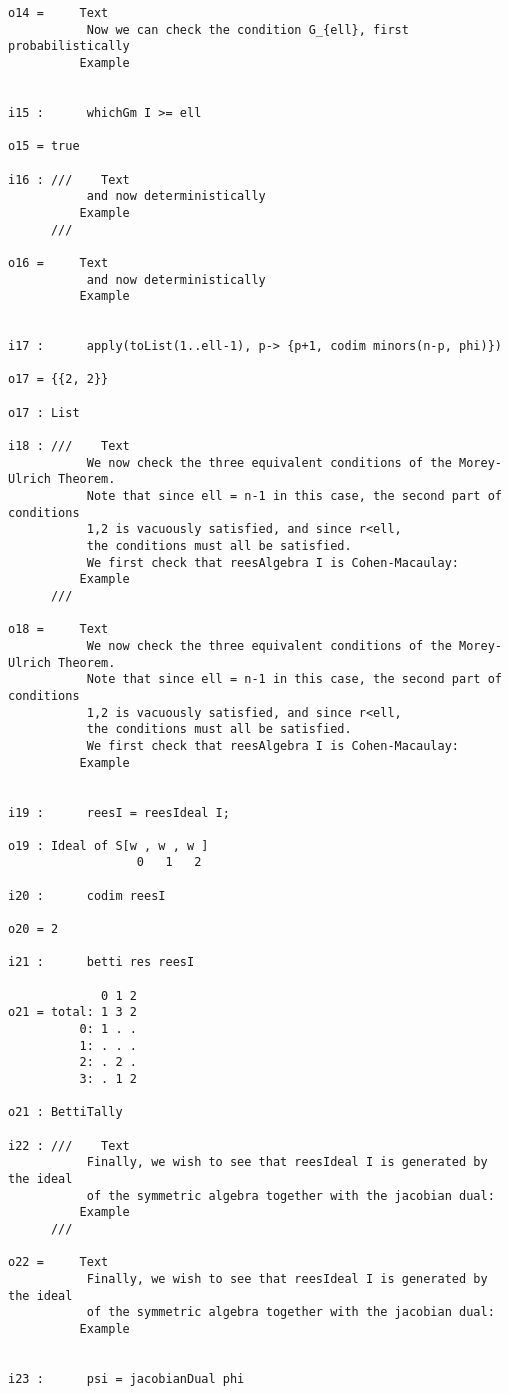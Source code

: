 \documentclass[twoside,12pt, leqno]{amsart}
\begin{document}
\begin{verbatim}
o14 =     Text
           Now we can check the condition G_{ell}, first probabilistically
          Example


i15 :      whichGm I >= ell

o15 = true

i16 : ///    Text
           and now deterministically
          Example
      ///    

o16 =     Text
           and now deterministically
          Example


i17 :      apply(toList(1..ell-1), p-> {p+1, codim minors(n-p, phi)})

o17 = {{2, 2}}

o17 : List

i18 : ///    Text
           We now check the three equivalent conditions of the Morey-Ulrich Theorem.
           Note that since ell = n-1 in this case, the second part of conditions
           1,2 is vacuously satisfied, and since r<ell,
           the conditions must all be satisfied.
           We first check that reesAlgebra I is Cohen-Macaulay:
          Example
      ///    

o18 =     Text
           We now check the three equivalent conditions of the Morey-Ulrich Theorem.
           Note that since ell = n-1 in this case, the second part of conditions
           1,2 is vacuously satisfied, and since r<ell,
           the conditions must all be satisfied.
           We first check that reesAlgebra I is Cohen-Macaulay:
          Example


i19 :      reesI = reesIdeal I;

o19 : Ideal of S[w , w , w ]
                  0   1   2

i20 :      codim reesI

o20 = 2

i21 :      betti res reesI

             0 1 2
o21 = total: 1 3 2
          0: 1 . .
          1: . . .
          2: . 2 .
          3: . 1 2

o21 : BettiTally

i22 : ///    Text
           Finally, we wish to see that reesIdeal I is generated by the ideal 
           of the symmetric algebra together with the jacobian dual:
          Example
      ///    

o22 =     Text
           Finally, we wish to see that reesIdeal I is generated by the ideal 
           of the symmetric algebra together with the jacobian dual:
          Example


i23 :      psi = jacobianDual phi


\end{verbatim}
\end{document}
